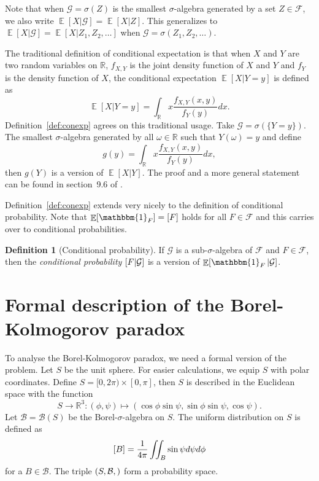 \documentclass[twoside,a4paper]{report}
\theoremstyle{plain}
\theoremstyle{definition}
\newtheorem{definition}[theorem]{Definition}
\theoremstyle{remark}
\numberwithin{equation}{chapter}
\newcommand{\R}{\mathbb{R}}
\let\P\relax
\DeclareMathOperator{\P}{\mathbb{P}}
\DeclareMathOperator{\E}{\mathbb{E}}
\DeclareMathOperator{\1}{\mathbbm{1}}
\newcommand{\F}{\mathcal{F}}
\renewcommand{\G}{\mathcal{G}}
\newcommand{\B}{\mathcal{B}}
\begin{document}
Note that when $\G=\sigma(Z)$ is the smallest $\sigma$-algebra generated by a set $Z\in\F$, we also write $\E[X|\G]=\E[X|Z]$. This generalizes to $\E[X|\G]=\E[X|Z_1,Z_2,\ldots]$ when $\G=\sigma(Z_1,Z_2,\ldots)$.

The traditional definition of conditional expectation is that when $X$ and $Y$ are two random variables on $\R$, $f_{X,Y}$ is the joint density function of $X$ and $Y$ and $f_Y$ is the density function of $X$, the conditional expectation $\E[X|Y=y]$ is defined as
\begin{equation}
\E[X|Y=y]=\int_\R x\frac{f_{X,Y}(x,y)}{f_Y(y)}dx.
\end{equation}
Definition~\ref{def:conexp} agrees on this traditional usage. Take $\G=\sigma(\{Y=y\})$. The smallest $\sigma$-algebra generated by all $\omega\in\R$ such that $Y(\omega)=y$ and define
\begin{equation}
g(y)=\int_\R x\frac{f_{X,Y}(x,y)}{f_Y(y)}dx,
\end{equation}
then $g(Y)$ is a version of $\E[X|Y]$. The proof and a more general statement can be found in section~9.6 of \cite{Williams91}.

Definition~\ref{def:conexp} extends very nicely to the definition of conditional probability. Note that $\E[\1_F]=\P[F]$ holds for all $F\in\F$ and this carries over to conditional probabilities.

\begin{definition}[Conditional probability]
If $\G$ is a sub-$\sigma$-algebra of $\F$ and $F\in\F$, then the \emph{conditional probability} $\P[F|\G]$ is a version of $\E[\1_F|\G]$.
\end{definition}

\section{Formal description of the Borel-Kolmogorov paradox}
To analyse the Borel-Kolmogorov paradox, we need a formal version of the problem. Let $S$ be the unit sphere. For easier calculations, we equip $S$ with polar coordinates. Define $S=[0,2\pi)\times[0,\pi]$, then $S$ is described in the Euclidean space with the function
\begin{equation}\label{eq:BorelPolar}
S\to\R^3:(\phi,\psi)\mapsto(\cos\phi\sin\psi,\sin\phi\sin\psi,\cos\psi).
\end{equation}
Let $\B=\B(S)$ be the Borel-$\sigma$-algebra on $S$. The uniform distribution on $S$ is defined as
\begin{equation}
\P[B]=\frac{1}{4\pi}\iint_B\sin\psi d\psi d\phi
\end{equation}
for a $B\in\B$. The triple $(S,\B,\P)$ form a probability space.
\end{document}
